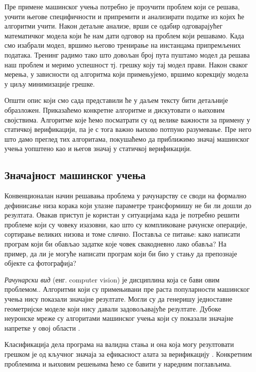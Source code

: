 \documentclass[a4paper]{article}
\begin{document}
{Пре примене машинског учења потребно је проучити проблем који се решава, уочити његове специфичности и припремити и анализирати податке из којих ће алгоритми учити. Након детаљне анализе, врши се одабир одговарајућег математичког модела који ће нам дати одговор на проблем који решавамо. Када смо изабрали модел, вршимо његово тренирање на инстанцама припремљених података. Тренинг радимо тако што довољан број пута пуштамо модел да решава наш проблем и меримо успешност тј. грешку коју тај модел прави. Након сваког мерења, у зависности од алгоритма који примењујемо, вршимо корекцију модела у циљу минимизације грешке.


Општи опис који смо сада представили ће у даљем тексту бити детаљније образложен. Приказаћемо конкретне алгоритме и дискутовати о њиховим својствима. Алгоритме које ћемо посматрати су од велике важности за примену у статичкој верификацији, па је с тога важно њихово потпуно разумевање. Пре него што дамо преглед тих алгоритама, покушаћемо да приближимо значај машинског учења уопштено као и његов значај у статичкој верификацији.


\subsection{Значајност машинског учења}
Конвенционалан начин решавања проблема у рачунарству се своди на формално дефинисање низа корака који улазне параметре трансформишу не би ли дошли до резултата. Овакав приступ је користан у ситуацијама када је потребно решити проблеме који су човеку изазовни, као што су компликоване рачунске операције, сортирање великих низова и томе слично. Поставља се питање: како написати програм који би обављао задатке које човек свакодневно лако обавља? На пример, да ли је могуће написати програм који би био у стању да препознаје објекте са фотографија?


\textit{Рачунарски вид} (енг. computer vision) је дисциплина која се бави овим проблемом.\cite{old-cv}. Алгоритми који су примењивани пре раста популарности машинског учења нису показали значајне резултате. Могли су да генеришу једноставне геометријске моделе који нису давали задовољавајуће резултате. Дубоке неуронске мреже су алгоритами машинског учења који су показали значајне напретке у овој области \cite{new-cv}.


Класификација дела програма на валидна стања и она која могу резултовати грешком је од кључног значаја за ефикасност алата за верификацију \cite{Brun04findinglatent} \cite{KrishnaPW15}. Конкретним проблемима и њиховим решењима ћемо се бавити у наредним поглављима. 


}
\end{document}
